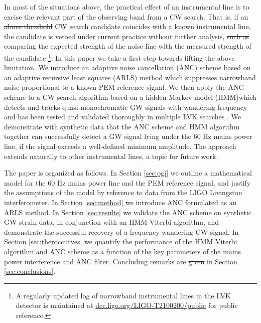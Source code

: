\documentclass[pra,superscriptaddress,reprint,amsmath,amssymb,nofootinbib]{revtex4-2}
\providecommand{\DIFaddtex}[1]{{\protect\color{blue}\uwave{#1}}} %
\providecommand{\DIFdeltex}[1]{{\protect\color{red}\sout{#1}}}                      %
\providecommand{\DIFaddbegin}{} %
\providecommand{\DIFaddend}{} %
\providecommand{\DIFdelbegin}{} %
\providecommand{\DIFdelend}{} %
\providecommand{\DIFadd}[1]{\texorpdfstring{\DIFaddtex{#1}}{#1}} %
\providecommand{\DIFdel}[1]{\texorpdfstring{\DIFdeltex{#1}}{}} %
\newcommand{\DIFscaledelfig}{0.5}
\newlength{\DIFdelgraphicswidth} %
\newlength{\DIFdelgraphicsheight} %
\newcommand{\DIFaddincludegraphics}[2][]{{\color{blue}\fbox{\DIFOincludegraphics[#1]{#2}}}} %
\newcommand{\DIFdelincludegraphics}[2][]{%
\sbox{\DIFdelgraphicsbox}{\DIFOincludegraphics[#1]{#2}}%
\settoboxwidth{\DIFdelgraphicswidth}{\DIFdelgraphicsbox} %
\settoboxtotalheight{\DIFdelgraphicsheight}{\DIFdelgraphicsbox} %
\scalebox{\DIFscaledelfig}{%
\parbox[b]{\DIFdelgraphicswidth}{\usebox{\DIFdelgraphicsbox}\\[-\baselineskip] \rule{\DIFdelgraphicswidth}{0em}}\llap{\resizebox{\DIFdelgraphicswidth}{\DIFdelgraphicsheight}{%
\setlength{\unitlength}{\DIFdelgraphicswidth}%
\begin{picture}(1,1)%
\thicklines\linethickness{2pt} %
{\color[rgb]{1,0,0}\put(0,0){\framebox(1,1){}}}%
{\color[rgb]{1,0,0}\put(0,0){\line( 1,1){1}}}%
{\color[rgb]{1,0,0}\put(0,1){\line(1,-1){1}}}%
\end{picture}%
}\hspace*{3pt}}} %
} %
\DeclareRobustCommand{\DIFaddbegin}{\DIFOaddbegin \let\includegraphics\DIFaddincludegraphics} %
\DeclareRobustCommand{\DIFaddend}{\DIFOaddend \let\includegraphics\DIFOincludegraphics} %
\DeclareRobustCommand{\DIFdelbegin}{\DIFOdelbegin \let\includegraphics\DIFdelincludegraphics} %
\DeclareRobustCommand{\DIFdelend}{\DIFOaddend \let\includegraphics\DIFOincludegraphics} %
\begin{document}
In most  of the situations above, the practical effect of an instrumental line is to excise the relevant part of the observing band from a CW search. That is, if an \DIFdelbegin \DIFdel{above threshold }\DIFdelend \DIFaddbegin \DIFadd{above-threshold }\DIFaddend CW search candidate coincides with a known instrumental line, the candidate is vetoed under current practice without further analysis, \DIFdelbegin \DIFdel{such as }\DIFdelend \DIFaddbegin \DIFadd{e.g.\ without }\DIFaddend comparing the expected strength of the noise line with the measured strength of the candidate \footnote{A regularly updated log of narrowband instrumental lines in the LVK detector is maintained at \href{https://dcc.ligo.org/LIGO-T2100200/public}{dcc.ligo.org/LIGO-T2100200/public} for public reference.}. In this paper we take a first step towards lifting the above limitation. We introduce an adaptive noise cancellation (ANC) scheme  based on an adaptive recursive least squares (ARLS) method which suppresses narrowband noise proportional to a known PEM reference signal. We then apply the ANC scheme to a CW search algorithm based on a hidden Markov model (HMM)\DIFaddbegin \DIFadd{, }\DIFaddend which detects and tracks quasi-monochromatic GW signals with wandering frequency and has been tested and validated thoroughly in multiple LVK searches \cite{Suvorova2016PhRv,Piccinni2022,Riles2023,Wette2023}. We demonstrate with synthetic data that the ANC scheme and HMM algorithm together can successfully detect a GW signal lying under the 60 Hz mains power line, if the signal exceeds a well-defined minimum amplitude. The approach extends naturally to other instrumental lines, a topic for future work. \newline 

The paper is organized as follows. In Section \ref{sec:pgi} we outline a mathematical model for the 60 Hz mains power line and the PEM reference signal, and justify the assumptions of the model by reference to data from the LIGO Livingston interferometer.  In Section \ref{sec:method} we introduce ANC formulated as an ARLS method. In Section \ref{sec:results} we validate the ANC scheme on synthetic GW strain data, in conjunction with an HMM Viterbi algorithm, and demonstrate the successful recovery of a frequency-wandering CW signal. In Section \ref{sec:theroccurves} we quantify the performance of the HMM Viterbi algorithm and ANC scheme as a function of the key parameters of the mains power interference and ANC filter. Concluding remarks are \DIFdelbegin \DIFdel{given }\DIFdelend \DIFaddbegin \DIFadd{made }\DIFaddend in Section \ref{sec:conclusions}.
\end{document}
